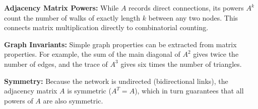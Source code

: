 \begin{takeaways}
\item \textbf{Adjacency Matrix Powers:} While $A$ records direct connections, its powers $A^k$ count the number of walks of exactly length $k$ between any two nodes. This connects matrix multiplication directly to combinatorial counting.
\item \textbf{Graph Invariants:} Simple graph properties can be extracted from matrix properties. For example, the sum of the main diagonal of $A^2$ gives twice the number of edges, and the trace of $A^3$ gives six times the number of triangles.
\item \textbf{Symmetry:} Because the network is undirected (bidirectional links), the adjacency matrix $A$ is symmetric ($A^T = A$), which in turn guarantees that all powers of $A$ are also symmetric.
\end{takeaways}


